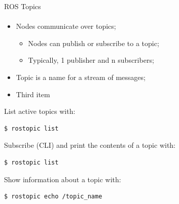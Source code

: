 \documentclass[aspectratio=169]{beamer}
\begin{document}
\begin{frame}[fragile]{ROS Topics}
	\framesubtitle{ }
	\begin{minipage}{0.6\textwidth}
    \begin{itemize}
        \item Nodes communicate over topics;
        \begin{itemize}
			\item Nodes can publish or subscribe to a topic;
			\item Typically, 1 publisher and n subscribers;
		\end{itemize}
        \item Topic is a name for a stream of messages;
        \item Third item
    \end{itemize}
	List active topics with:
	\begin{lstlisting}[language=bash]
		$ rostopic list
    \end{lstlisting}
	Subscribe (CLI) and print the contents of a topic with:
	\begin{lstlisting}[language=bash]
		$ rostopic list
    \end{lstlisting}
	Show information about a topic with:
	\begin{lstlisting}[language=bash]
		$ rostopic echo /topic_name
    \end{lstlisting}
\end{minipage}
\begin{minipage}{0.4\textwidth}
	
\end{minipage}
\end{frame}
\end{document}
